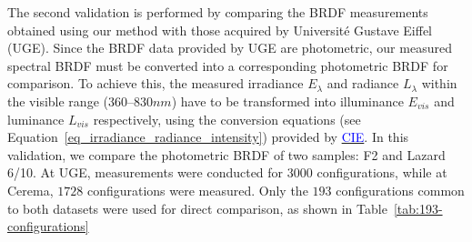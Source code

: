 The second validation is performed by comparing the BRDF measurements obtained using our method with those acquired by Université Gustave Eiffel (UGE).
Since the BRDF data provided by UGE are photometric, our measured spectral BRDF must be converted into a corresponding photometric BRDF for comparison.
To achieve this, the measured irradiance $E_\lambda$ and radiance $L_\lambda$ within the visible range ($360$–$830 nm$) have to be transformed into illuminance $E_{vis}$ and luminance $L_{vis}$ respectively, using the conversion equations (see Equation~\eqref{eq_irradiance_radiance_intensity}) provided by \href{https://doi.org/10.25039/CIE.DS.dktna2s3}{\textcolor{blue}{CIE}}.
In this validation, we compare the photometric BRDF of two samples: F2 and Lazard 6/10.
At UGE, measurements were conducted for $3000$ configurations, while at Cerema, $1728$ configurations were measured.
Only the $193$ configurations common to both datasets were used for direct comparison, as shown in Table~\ref{tab:193-configurations}


